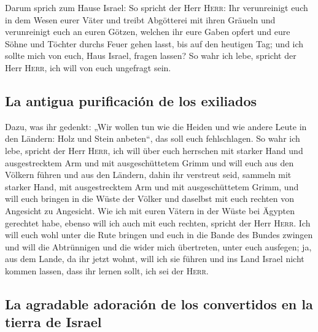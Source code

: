  Darum sprich zum Hause Israel: So spricht der Herr
\textsc{Herr}: Ihr verunreinigt euch in dem Wesen eurer Väter und treibt
Abgötterei mit ihren Gräueln  und verunreinigt euch an
euren Götzen, welchen ihr eure Gaben opfert und eure Söhne und Töchter
durchs Feuer gehen lasst, bis auf den heutigen Tag; und ich sollte mich
von euch, Haus Israel, fragen lassen? So wahr ich lebe, spricht der Herr
\textsc{Herr}, ich will von euch ungefragt sein.

\hypertarget{la-antigua-purificaciuxf3n-de-los-exiliados}{%
\subsection{La antigua purificación de los
exiliados}\label{la-antigua-purificaciuxf3n-de-los-exiliados}}

 Dazu, was ihr gedenkt: „Wir wollen tun wie die Heiden
und wie andere Leute in den Ländern: Holz und Stein anbeten``, das soll
euch fehlschlagen.  So wahr ich lebe, spricht der Herr
\textsc{Herr}, ich will über euch herrschen mit starker Hand und
ausgestrecktem Arm und mit ausgeschüttetem Grimm  und
will euch aus den Völkern führen und aus den Ländern, dahin ihr
verstreut seid, sammeln mit starker Hand, mit ausgestrecktem Arm und mit
ausgeschüttetem Grimm,  und will euch bringen in die
Wüste der Völker und daselbst mit euch rechten von Angesicht zu
Angesicht.  Wie ich mit euren Vätern in der Wüste bei
Ägypten gerechtet habe, ebenso will ich auch mit euch rechten, spricht
der Herr \textsc{Herr}.  Ich will euch wohl unter die
Rute bringen und euch in die Bande des Bundes zwingen 
und will die Abtrünnigen und die wider mich übertreten, unter euch
ausfegen; ja, aus dem Lande, da ihr jetzt wohnt, will ich sie führen und
ins Land Israel nicht kommen lassen, dass ihr lernen sollt, ich sei der
\textsc{Herr}.

\hypertarget{la-agradable-adoraciuxf3n-de-los-convertidos-en-la-tierra-de-israel}{%
\subsection{La agradable adoración de los convertidos en la tierra de
Israel}\label{la-agradable-adoraciuxf3n-de-los-convertidos-en-la-tierra-de-israel}}

